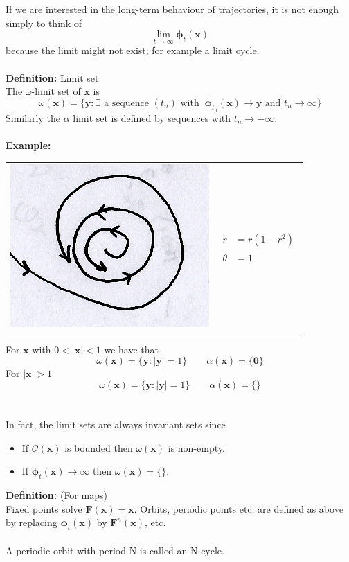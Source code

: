 \documentclass{article}
\newcommand{\cO}{\mathcal{O}} %
\newcommand{\bp}{\bm{\phi}}   %
\begin{document}
\noindent If we are interested in the long-term behaviour of trajectories, it is not 
enough simply to think of 
\[ \lim_{t \to \infty} \bp_t(\bm{x}) \]
because the limit might not exist; for example a limit cycle.
\\
\\
\textbf{Definition:} Limit set
\\
The $\omega$-limit set of $\bm{x}$ is 
\[ \omega (\bm{x}) = \{ \bm{y} : \exists \mbox{ a sequence } (t_n) \mbox{ with }\
 \bp_{t_n}(\bm{x}) \to \bm{y} \mbox{ and } t_n \to \infty \} \]
Similarly the $\alpha$ limit set is defined by sequences with $t_n \to - \infty$.
\\
\\
\textbf{Example:} \\
%
\begin{center}
\begin{tabular}{ m{4.5cm} m{4.5cm}  }\centering 
\includegraphics[scale = 0.35]{fig4.png}  & 
$ \begin{array}{rl}
\dot{r} &= r(1-r^2) \\
\dot{\theta} &= 1
 \end{array}$
\end{tabular} 
\end{center}
%
For $\bm{x}$ with $0 < |\bm{x}| < 1$ we have that
\[ \omega ( \bm{x} ) = \{ \bm{y} : |\bm{y}| = 1 \}  \qquad  \alpha ( \bm{x} ) = \{\bm{0} \} \]
For $|\bm{x}|>1$
\[ \omega ( \bm{x} ) = \{ \bm{y} : |\bm{y}| = 1 \}  \qquad  \alpha ( \bm{x} ) = \{ \} \]
\\
\\
In fact, the limit sets are always invariant sets since
\begin{itemize}
\item If $\cO(\bm{x})$ is bounded then $\omega(\bm{x})$ is non-empty.
\item If $\bp_t(\bm{x}) \to \infty$ then $\omega(\bm{x}) = \{ \} $.
\end{itemize}\vspace{3mm}
\textbf{Definition:} (For maps) 
\\
Fixed points solve $\bm{F}(\bm{x}) = \bm{x}$. Orbits, periodic points etc.
are defined as above by replacing $\bp_t(\bm{x})$ by $\bm{F}^n(\bm{x})$,
etc.
\\
\\
A periodic orbit with period N is called an N-cycle.
\end{document}
